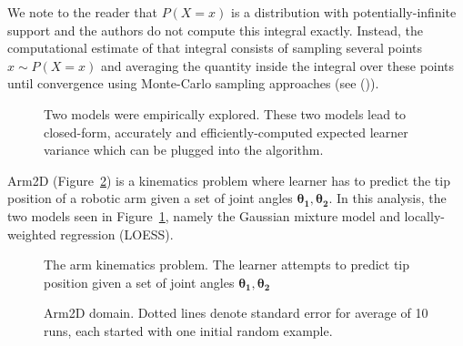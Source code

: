 \documentclass[
  letterpaper,
  numbers=noenddot,
  DIV=11]{scrreprt}
\theoremstyle{definition}
\theoremstyle{plain}
\theoremstyle{plain}
\theoremstyle{remark}
\begin{document}
We note to the reader that \(P(X=x)\) is a distribution with
potentially-infinite support and the authors do not compute this
integral exactly. Instead, the computational estimate of that integral
consists of sampling several points \(x \sim P(X=x)\) and averaging the
quantity inside the integral over these points until convergence using
Monte-Carlo sampling approaches (see ()).

\begin{figure}


\caption{\label{fig-two_models}Two models were empirically explored.
These two models lead to closed-form, accurately and
efficiently-computed expected learner variance which can be plugged into
the algorithm.}

\end{figure}%

Arm2D (Figure~\ref{fig-arm2D}) is a kinematics problem where learner has
to predict the tip position of a robotic arm given a set of joint angles
\(\mathbf{\theta_1}, \mathbf{\theta_2}\). In this analysis, the two
models seen in Figure~\ref{fig-two_models}, namely the Gaussian mixture
model and locally-weighted regression (LOESS).

\begin{figure}


\caption{\label{fig-arm2D}The arm kinematics problem. The learner
attempts to predict tip position given a set of joint angles
\(\mathbf{\theta_1}, \mathbf{\theta_2}\)}

\end{figure}%

\begin{figure}


\caption{\label{fig-empirical:gauss}Arm2D domain. Dotted lines denote
standard error for average of 10 runs, each started with one initial
random example.}

\end{figure}%
\end{document}
